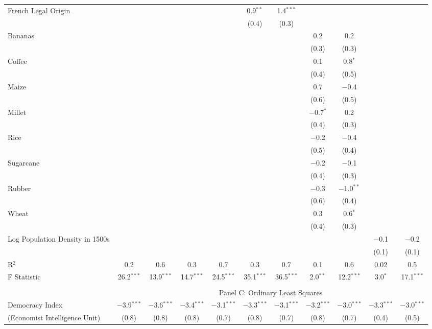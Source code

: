 \begin{table}[!htbp]
\begin{threeparttable}
\begin{tabular}{@{\extracolsep{0pt}}lcccccccccc}
  French Legal Origin &  &  &  &  & 0.9$^{**}$ & 1.4$^{***}$ &  &  &  &  \\ 
  &  &  &  &  & (0.4) & (0.3) &  &  &  &  \\ 
  Bananas &  &  &  &  &  &  & 0.2 & 0.2 &  &  \\ 
  &  &  &  &  &  &  & (0.3) & (0.3) &  &  \\ 
  Coffee &  &  &  &  &  &  & 0.1 & 0.8$^{*}$ &  &  \\ 
  &  &  &  &  &  &  & (0.4) & (0.5) &  &  \\ 
  Maize &  &  &  &  &  &  & 0.7 & $-$0.4 &  &  \\ 
  &  &  &  &  &  &  & (0.6) & (0.5) &  &  \\ 
  Millet &  &  &  &  &  &  & $-$0.7$^{*}$ & 0.2 &  &  \\ 
  &  &  &  &  &  &  & (0.4) & (0.3) &  &  \\ 
  Rice &  &  &  &  &  &  & $-$0.2 & $-$0.4 &  &  \\ 
  &  &  &  &  &  &  & (0.5) & (0.4) &  &  \\ 
  Sugarcane &  &  &  &  &  &  & $-$0.2 & $-$0.1 &  &  \\ 
  &  &  &  &  &  &  & (0.4) & (0.3) &  &  \\ 
  Rubber &  &  &  &  &  &  & $-$0.3 & $-$1.0$^{**}$ &  &  \\ 
  &  &  &  &  &  &  & (0.6) & (0.4) &  &  \\ 
  Wheat &  &  &  &  &  &  & 0.3 & 0.6$^{*}$ &  &  \\ 
  &  &  &  &  &  &  & (0.4) & (0.3) &  &  \\ 
  Log Population Density in 1500s &  &  &  &  &  &  &  &  & $-$0.1 & $-$0.2 \\ 
  &  &  &  &  &  &  &  &  & (0.1) & (0.1) \\ 
  R$^{2}$ & 0.2 & 0.6 & 0.3 & 0.7 & 0.3 & 0.7 & 0.1 & 0.6 & 0.02 & 0.5 \\ 
F Statistic & 26.2$^{***}$  & 13.9$^{***}$  & 14.7$^{***}$  & 24.5$^{***}$  & 35.1$^{***}$ & 36.5$^{***}$  & 2.0$^{**}$ & 12.2$^{***}$  & 3.0$^{*}$ & 17.1$^{***}$  \\ 
\hline  \\[-1.8ex] 
   & \multicolumn{10}{c}{Panel C: Ordinary Least Squares} \\
Democracy Index & $-$3.9$^{***}$ & $-$3.6$^{***}$ & $-$3.4$^{***}$ & $-$3.1$^{***}$ & $-$3.3$^{***}$ & $-$3.1$^{***}$ & $-$3.2$^{***}$ & $-$3.0$^{***}$ & $-$3.3$^{***}$ & $-$3.0$^{***}$ \\ 
(Economist Intelligence Unit)  & (0.8) & (0.8) & (0.8) & (0.7) & (0.8) & (0.7) & (0.8) & (0.7) & (0.4) & (0.5) \\ 


\end{tabular}
\end{threeparttable}
\end{table}
